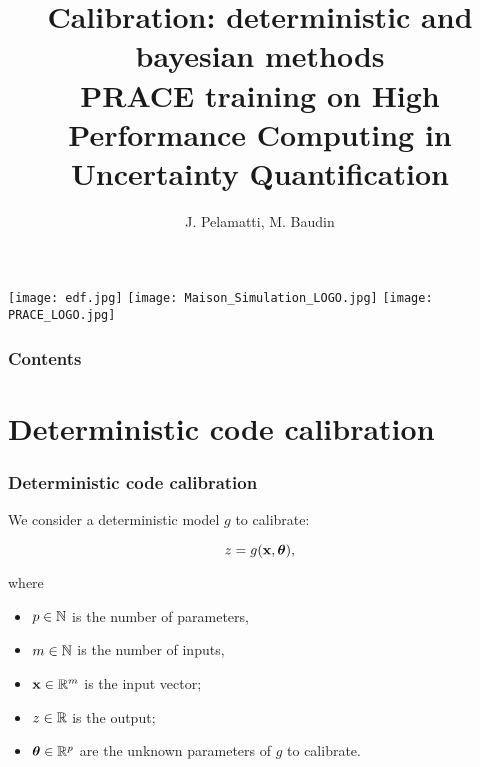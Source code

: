 \documentclass[aspectratio=169]{beamer}
\title[PRACE/UQ: Calibration]{
Calibration: deterministic and bayesian methods \\
PRACE training on High Performance Computing in Uncertainty Quantification 
}
\author[Pelamatti]{
J. Pelamatti, M. Baudin}
\begin{document}

\begin{frame}
\titlepage
  
\begin{center}
\texttt{[image: edf.jpg]}
\hspace{1cm}
\texttt{[image: Maison\_Simulation\_LOGO.jpg]}
\hspace{1cm}
\texttt{[image: PRACE\_LOGO.jpg]}
\end{center}

\end{frame}


\begin{frame}
\frametitle{Contents}
\tableofcontents
\end{frame}

\section{Deterministic code calibration}


\begin{frame}
\frametitle{Deterministic code calibration}

We consider a deterministic model $g$ to calibrate:

$$
z = g({\bf x}, \boldsymbol{\theta}),
$$

where

\begin{itemize}
\item $p \in\mathbb{N}$ is the number of parameters, 
\item $m \in\mathbb{N}$ is the number of inputs, 
\item ${\bf x} \in \mathbb{R}^{m}$ is the input vector;
\item $z \in \mathbb{R}$ is the output;
\item $\boldsymbol{\theta} \in \mathbb{R}^p$ are the unknown parameters of 
      $g$ to calibrate.
\end{itemize}

\end{frame}

\end{document}
